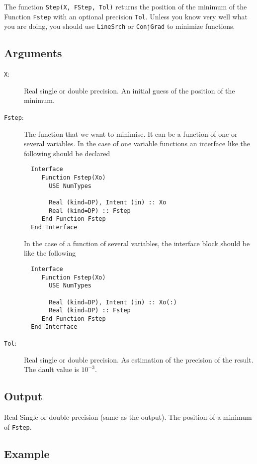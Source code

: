 The function \texttt{Step(X, FStep, Tol)} returns the position of the
minimum of the Function \texttt{Fstep} with an optional precision
\texttt{Tol}. Unless you know very well what you are doing, you should
use \texttt{LineSrch} or \texttt{ConjGrad} to minimize functions.

\subsection{Arguments}

\begin{description}
\item[\texttt{X}:] Real single or double precision. An initial guess
  of the position of the minimum.
\item[\texttt{Fstep}:]  The function that we want to minimise. It can
  be a function of one or several variables. In the case of one
  variable functions an interface like the following should be
  declared
\begin{verbatim}
  Interface
     Function Fstep(Xo)
       USE NumTypes
       
       Real (kind=DP), Intent (in) :: Xo
       Real (kind=DP) :: Fstep
     End Function Fstep
  End Interface
\end{verbatim}
  In the case of a function of several variables, the interface block
  should be like the following
\begin{verbatim}
  Interface
     Function Fstep(Xo)
       USE NumTypes
       
       Real (kind=DP), Intent (in) :: Xo(:)
       Real (kind=DP) :: Fstep
     End Function Fstep
  End Interface
\end{verbatim}

\item[\texttt{Tol}:] Real single or double precision. As estimation of
  the precision of the result. The dault value is $10^{-3}$.
  
\end{description}

\subsection{Output}

Real Single or double precision (same as the output). The position of
a minimum of \texttt{Fstep}.

\subsection{Example}

